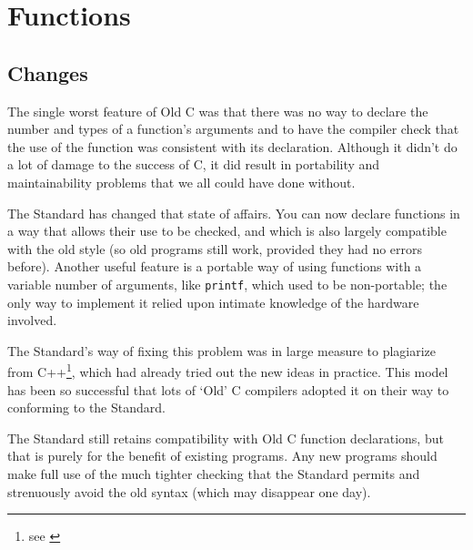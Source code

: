  \chapter{Functions}\label{chap:funcs}


        \section{Changes}
        

  

  The single worst feature of Old C was that there was no way to declare
   the number and types of a function's arguments and to have the compiler
   check that the use of the function was consistent with its declaration.
   Although it didn't do a lot of damage to the success of C, it did result
   in portability and maintainability problems that we all could have done
   without.


  The Standard has changed that state of affairs. You can now declare
   functions in a way that allows their use to be checked, and which is also
   largely compatible with the old style (so old programs still work,
   provided they had no errors before). Another useful feature is a portable
   way of using functions with a variable number of arguments, like
   \texttt{printf}, which used to be non-portable; the only way to
   implement it relied upon intimate knowledge of the hardware involved.


  The Standard's way of fixing this problem was in large measure to
  plagiarize from C++\footnote{see \cite{Stro}},
  which had already tried out the new ideas in
   practice. This model has been so successful that lots of `Old' C
   compilers adopted it on their way to conforming to the Standard.


  The Standard still retains compatibility with Old C function
   declarations, but that is purely for the benefit of existing programs.
   Any new programs should make full use of the much tighter checking that
   the Standard permits and strenuously avoid the old syntax (which may
   disappear one day).





